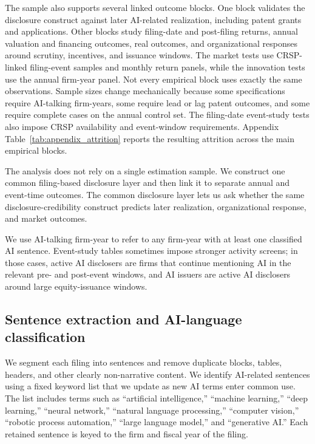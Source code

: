 The sample also supports several linked outcome blocks. One block validates the disclosure construct against later AI-related realization, including patent grants and applications. Other blocks study filing-date and post-filing returns, annual valuation and financing outcomes, real outcomes, and organizational responses around scrutiny, incentives, and issuance windows. The market tests use CRSP-linked filing-event samples and monthly return panels, while the innovation tests use the annual firm-year panel. Not every empirical block uses exactly the same observations. Sample sizes change mechanically because some specifications require AI-talking firm-years, some require lead or lag patent outcomes, and some require complete cases on the annual control set. The filing-date event-study tests also impose CRSP availability and event-window requirements. Appendix Table~\ref{tab:appendix_attrition} reports the resulting attrition across the main empirical blocks.

The analysis does not rely on a single estimation sample. We construct one common filing-based disclosure layer and then link it to separate annual and event-time outcomes. The common disclosure layer lets us ask whether the same disclosure-credibility construct predicts later realization, organizational response, and market outcomes.

We use AI-talking firm-year to refer to any firm-year with at least one classified AI sentence. Event-study tables sometimes impose stronger activity screens; in those cases, active AI disclosers are firms that continue mentioning AI in the relevant pre- and post-event windows, and AI issuers are active AI disclosers around large equity-issuance windows.

\subsection{Sentence extraction and AI-language classification}

We segment each filing into sentences and remove duplicate blocks, tables, headers, and other clearly non-narrative content. We identify AI-related sentences using a fixed keyword list that we update as new AI terms enter common use. The list includes terms such as ``artificial intelligence,'' ``machine learning,'' ``deep learning,'' ``neural network,'' ``natural language processing,'' ``computer vision,'' ``robotic process automation,'' ``large language model,'' and ``generative AI.'' Each retained sentence is keyed to the firm and fiscal year of the filing.


